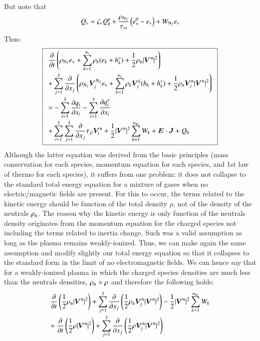 \documentclass{warpdoc}
\newcommand\frameeqn[1]{\fbox{$\displaystyle #1$}}
\newcommand{\alb}{\vspace{0.1cm}\\} %
\newcommand{\mfd}{\displaystyle}
\newcommand{\ns}{{n_{\rm s}}}
\newcommand{\nns}{{n_{\rm ns}}}
\newcommand{\ev}{{e_{\rm v}}}
\newcommand{\evzero}{{e_{\rm v}^0}}
\newcommand{\tauvt}{\tau_{\rm vt}}
\renewcommand{\vec}[1]{\bm{#1}}
\begin{document}
%  
But note that
%
\begin{equation}
Q_{\rm v}= \zeta_{\rm v}Q_{\rm J}^{\rm e}+ {\frac{\rho_{\rm N_2}}{\tauvt}}\left( \evzero-\ev \right) + W_{\rm N_2} \ev
\end{equation}
%
Thus:
%
\begin{equation}
\frameeqn{
\begin{array}{l}\mfd
 \frac{\partial }{\partial t}\left(\rho_{\rm N_2} \ev+\sum_{k=1}^\ns \rho_k (e_k+h_k^\circ)+\frac{1}{2}\rho_{\rm n}|\vec{V}^{\rm n}|^2 \right) \alb\mfd
+ \sum_{j=1}^3  \frac{\partial }{\partial x_j} \left(\rho_{\rm N_2} \vec{V}_j^{\rm N_2} \ev + \sum_{k=1}^\ns \rho_k \vec{V}^k_j (h_k+h_k^\circ)+\frac{1}{2}\rho_{\rm n}\vec{V}^{\rm n}_j|\vec{V}^{\rm n}|^2 \right)
 \alb\mfd
=
-\sum_{i=1}^{3}\frac{\partial q_i}{\partial x_i}
-\sum_{i=1}^{3}\frac{\partial q_i^{\rm v}}{\partial x_i}\alb\mfd
+\sum_{i=1}^3 \sum_{j=1}^3  \frac{\partial }{\partial x_j} \tau_{ji} \vec{V}_i^{\rm n}
+\frac{1}{2}|\vec{V}^{\rm n}|^2 \sum_{k=1}^\nns W_k
+ \vec{E}\cdot\vec{J}
+ Q_{\rm b}
\end{array}
}
\label{eqn:etotal1}
\end{equation}
%  
Although the latter equation was derived from the basic principles (mass conservation for each species, momentum equation for each species, and 1st law of thermo for each species), it suffers from one problem: it does not collapse to the standard total energy equation for a mixture of gases when no electric/magnetic fields are present. For this to occur, the terms related to the kinetic energy should be function of the total density $\rho$, not of the density of the neutrals $\rho_{\rm n}$. The reason why the kinetic energy is only function of the neutrals density originates from the momentum equation for the charged species not including the terms related to inertia change. Such was a valid assumption as long as the plasma remains weakly-ionized. Thus, we can make again the same assumption and modify slightly our total energy equation so that it collapses to the standard form in the limit of no electromagnetic fields. We can hence say that for a weakly-ionized plasma in which the charged species densities are much less than the neutrals densities, $\rho_{\rm n}\approx \rho$ and therefore the following holds:
%
\begin{equation}
\begin{array}{l}\mfd
\frac{\partial }{\partial t} \left(\frac{1}{2}\rho_{\rm n}|\vec{V}^{\rm n}|^2\right)
+ \sum_{j=1}^3  \frac{\partial }{\partial x_j} \left(
\frac{1}{2}\rho_{\rm n}\vec{V}^{\rm n}_j|\vec{V}^{\rm n}|^2
\right)
-\frac{1}{2}|\vec{V}^{\rm n}|^2 \sum_{k=1}^\nns W_k\alb\mfd
\approx
\frac{\partial }{\partial t} \left(\frac{1}{2}\rho |\vec{V}^{\rm n}|^2\right)
+ \sum_{j=1}^3  \frac{\partial }{\partial x_j} \left(
\frac{1}{2}\rho \vec{V}^{\rm n}_j|\vec{V}^{\rm n}|^2
\right)
\end{array}
\label{eqn:etotal2}
\end{equation}
\end{document}
